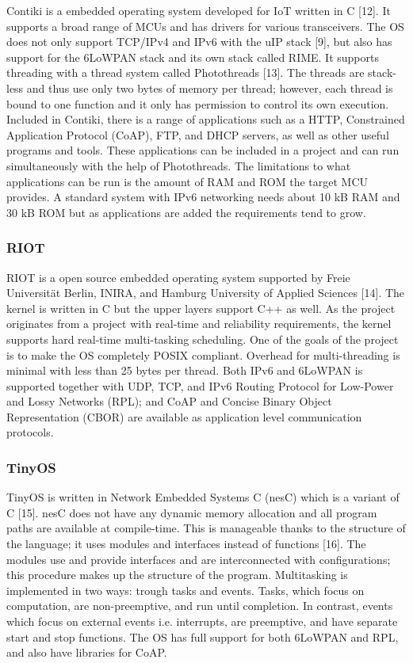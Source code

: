 Contiki is a embedded operating system developed for IoT written in C [12].
It supports a broad range of MCUs and has drivers for various transceivers.
The OS does not only support TCP/IPv4 and IPv6 with the uIP stack [9],
	but also has support for the 6LoWPAN stack and its own stack called RIME.
It supports threading with a thread system called Photothreads [13].
The threads are stack-less and thus use only two bytes of memory per thread;
	however,
	each thread is bound to one function and it only has permission to control its own execution.
Included in Contiki,
	there is a range of applications such as a HTTP,
	Constrained Application Protocol (CoAP),
	FTP,
	and DHCP servers,
	as well as other useful programs and tools.
These applications can be included in a project and can run simultaneously with the help of Photothreads.
The limitations to what applications can be run is the amount of RAM and ROM the target MCU provides.
A standard system with IPv6 networking needs about 10 kB RAM and 30 kB ROM but as applications are added the requirements tend to grow.

\subsubsection{RIOT}

RIOT is a open source embedded operating system supported by Freie Universität Berlin,
	INIRA,
	and Hamburg University of Applied Sciences [14].
The kernel is written in C but the upper layers support C++ as well.
As the project originates from a project with real-time and reliability requirements,
	the kernel supports hard real-time multi-tasking scheduling.
One of the goals of the project is to make the OS completely POSIX compliant.
Overhead for multi-threading is minimal with less than 25 bytes per thread.
Both IPv6 and 6LoWPAN is supported together with UDP,
	TCP,
	and IPv6 Routing Protocol for Low-Power and Lossy Networks (RPL);
	and CoAP and Concise Binary Object Representation (CBOR) are available as application level communication protocols.

\subsubsection{TinyOS}

TinyOS is written in Network Embedded Systems C (nesC) which is a variant of C [15].
nesC does not have any dynamic memory allocation and all program paths are available at compile-time.
This is manageable thanks to the structure of the language;
	it uses modules and interfaces instead of functions [16].
The modules use and provide interfaces and are interconnected with configurations;
	this procedure makes up the structure of the program.
Multitasking is implemented in two ways:
	trough tasks and events.
Tasks,
	which focus on computation,
	are non-preemptive,
	and run until completion.
In contrast,
	events which focus on external events i.e.
interrupts,
	are preemptive,
	and have separate start and stop functions.
The OS has full support for both 6LoWPAN and RPL,
	and also have libraries for CoAP.


